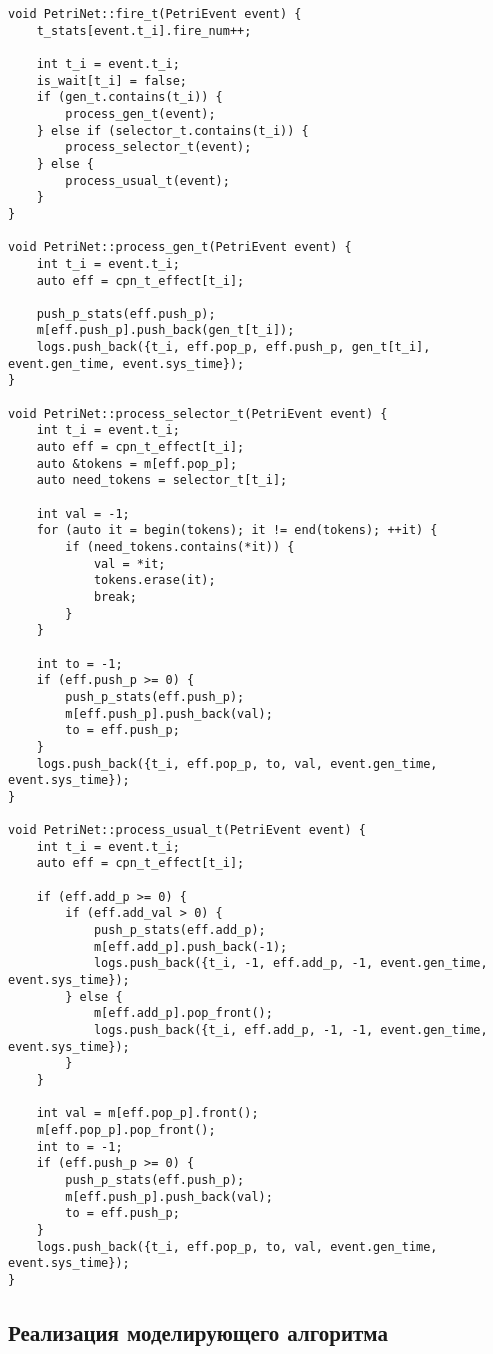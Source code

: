 \begin{center}
	\captionsetup{justification=raggedright,singlelinecheck=off}
	\begin{lstlisting}[label=lst:fire,caption=Функции срабатывания перехода ,showstringspaces=false]
void PetriNet::fire_t(PetriEvent event) {
	t_stats[event.t_i].fire_num++;
	
	int t_i = event.t_i;
	is_wait[t_i] = false;
	if (gen_t.contains(t_i)) {
		process_gen_t(event);
	} else if (selector_t.contains(t_i)) {
		process_selector_t(event);
	} else {
		process_usual_t(event);
	}
}

void PetriNet::process_gen_t(PetriEvent event) {
	int t_i = event.t_i;
	auto eff = cpn_t_effect[t_i];
	
	push_p_stats(eff.push_p);
	m[eff.push_p].push_back(gen_t[t_i]);
	logs.push_back({t_i, eff.pop_p, eff.push_p, gen_t[t_i], event.gen_time, event.sys_time});
}

void PetriNet::process_selector_t(PetriEvent event) {
	int t_i = event.t_i;
	auto eff = cpn_t_effect[t_i];
	auto &tokens = m[eff.pop_p];
	auto need_tokens = selector_t[t_i];
	
	int val = -1;
	for (auto it = begin(tokens); it != end(tokens); ++it) {
		if (need_tokens.contains(*it)) {
			val = *it;
			tokens.erase(it);
			break;
		}
	}
	
	int to = -1;
	if (eff.push_p >= 0) {
		push_p_stats(eff.push_p);
		m[eff.push_p].push_back(val);
		to = eff.push_p;
	}
	logs.push_back({t_i, eff.pop_p, to, val, event.gen_time, event.sys_time});
}

void PetriNet::process_usual_t(PetriEvent event) {
	int t_i = event.t_i;
	auto eff = cpn_t_effect[t_i];
	
	if (eff.add_p >= 0) {
		if (eff.add_val > 0) {
			push_p_stats(eff.add_p);
			m[eff.add_p].push_back(-1);
			logs.push_back({t_i, -1, eff.add_p, -1, event.gen_time, event.sys_time});
		} else {
			m[eff.add_p].pop_front();
			logs.push_back({t_i, eff.add_p, -1, -1, event.gen_time, event.sys_time});
		}
	}
	
	int val = m[eff.pop_p].front();
	m[eff.pop_p].pop_front();
	int to = -1;
	if (eff.push_p >= 0) {
		push_p_stats(eff.push_p);
		m[eff.push_p].push_back(val);
		to = eff.push_p;
	}
	logs.push_back({t_i, eff.pop_p, to, val, event.gen_time, event.sys_time});
}

	\end{lstlisting}
\end{center}
\FloatBarrier

\subsection{Реализация моделирующего алгоритма}

